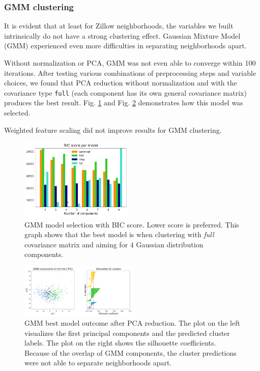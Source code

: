 \documentclass[compsoc]{IEEEtran}
\let\MYoriglatexcaption\caption
\renewcommand{\caption}[2][\relax]{\MYoriglatexcaption[#2]{#2}}
\begin{document}
\subsubsection{GMM clustering}

It is evident that at least for Zillow neighborhoods, the variables we built intrinsically do not have a strong clustering effect. Gaussian Mixture Model (GMM) experienced even more difficulties in separating neighborhoods apart.

Without normalization or PCA, GMM was not even able to converge within 100 iterations. After testing various combinations of preprocessing steps and variable choices, we found that PCA reduction without normalization and with the covariance type \texttt{full} (each component has its own general covariance matrix) produces the best result. Fig. \ref{nbh-gmm-bic} and Fig. \ref{nbh-gmm} demonstrates how this model was selected.

Weighted feature scaling did not improve results for GMM clustering.

\begin{figure}[h]
  \centering
  \hspace{-.5em}
    \includegraphics[width=0.48\textwidth]{nbh-gmm-bic}
  \caption{GMM model selection with BIC score. Lower score is preferred. This graph shows that the best model is when clustering with \textit{full} covariance matrix and aiming for $4$ Gaussian distribution components.}
  \label{nbh-gmm-bic}
\end{figure}

\begin{figure}[h]
  \hspace{-.5em}
    \includegraphics[width=0.5\textwidth]{nbh-gmm}
  \caption{GMM best model outcome after PCA reduction. The plot on the left visualizes the first principal components and the predicted cluster labels. The plot on the right shows the silhouette coefficients. Because of the overlap of GMM components, the cluster predictions were not able to separate neighborhoods apart.}
  \label{nbh-gmm}
\end{figure}
\end{document}
